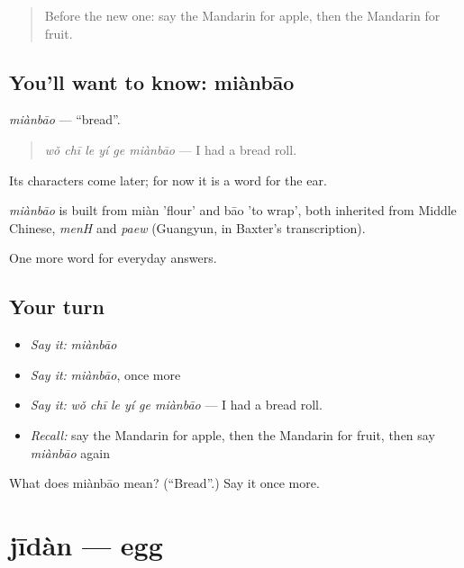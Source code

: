 \label{lesson:ZH-C40-mianbao}



\begin{quote}
Before the new one: say the Mandarin for apple, then the Mandarin for fruit.
\end{quote}

\subsection*{You'll want to know: miànbāo}
\emph{miànbāo} — \textquotedblleft{}bread\textquotedblright{}.

\begin{quote}
\emph{wǒ chī le yí ge miànbāo} — I had a bread roll.
\end{quote}

Its characters come later; for now it is a word for the ear.

\begin{cousinweb}
\emph{miànbāo} is built from miàn 'flour' and bāo 'to wrap', both inherited from Middle Chinese, \emph{menH} and \emph{paew} (Guangyun, in Baxter's transcription).
\end{cousinweb}

\begin{grammarlens}[title={What you've built}]
One more word for everyday answers.
\end{grammarlens}

\subsection*{Your turn}
\begin{itemize}
\raggedright
  \item \emph{Say it:} \emph{miànbāo}
  \item \emph{Say it:} \emph{miànbāo}, once more
  \item \emph{Say it:} \emph{wǒ chī le yí ge miànbāo} — I had a bread roll.
  \item \emph{Recall:} say the Mandarin for apple, then the Mandarin for fruit, then say \emph{miànbāo} again
\end{itemize}

\begin{tcolorbox}[breakable,colback=teal!4,colframe=teal!35!black,title={Before you move on}]
What does miànbāo mean? (\textquotedblleft{}Bread\textquotedblright{}.) Say it once more.
\end{tcolorbox}
\section[jīdàn]{jīdàn — egg}

